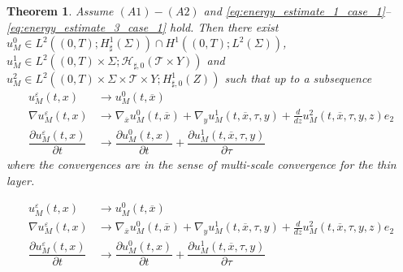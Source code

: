 \documentclass[10pt,a4paper]{amsart}
\newtheorem{theorem}{Theorem}
\def\T{\mathcal{T}}
\def\es{\varepsilon}
\begin{document}
   \begin{theorem}\label{theorem:convergence_in_the_layer}
    Assume $(A1)-(A2)$ and \eqref{eq:energy_estimate_1_case_1}--\eqref{eq:energy_estimate_3_case_1} hold. Then there exist \\ $u_M^0\in L^2((0,T);H^1_{\sharp}(\Sigma))\cap H^1((0,T);L^2(\Sigma))$, $u_M^1\in L^2((0,T)\times \Sigma;\mathcal{H}_{\sharp,0}(\T\times Y))$ and $u_M^2\in L^2((0,T)\times \Sigma \times \T\times Y;H^1_{\sharp,0}(Z) )$ such that up to a subsequence
    \begin{subequations}
    \begin{align}
        u_M^\es(t,x)&\longrightarrow u_M^0(t,\overline{x})\label{eq:multiscale_convergence_for_u}\\
        \nabla u_M^\es(t,x)&\longrightarrow \nabla_{\overline{x}}u_M^0(t,\overline{x})+\nabla_y u_M^1(t,\overline{x},\tau,y)+\frac{d}{dz}u_M^2(t,\overline{x},\tau,y,z)e_2\label{eq:multiscale_convergence_for_gradient_term} \\
        \dfrac{\partial u_M^\es(t,x)}{\partial t}&\longrightarrow  \dfrac{\partial u_M^0(t,x)}{\partial t}+ \dfrac{\partial u_M^1(t,\overline{x},\tau,y)}{\partial \tau}\label{eq:multiscale_convergence_for_time_derivative_term}
    \end{align}
    \end{subequations}
    where the convergences are in the sense of multi-scale convergence for the thin layer.
    \end{theorem}

    \begin{align}
        u_M^\es(t,x)&\longrightarrow u_M^0(t,\overline{x})\\
        \nabla u_M^\es(t,x)&\longrightarrow \nabla_{\overline{x}}u_M^0(t,\overline{x})+\nabla_y u_M^1(t,\overline{x},\tau,y)+\frac{d}{dz}u_M^2(t,\overline{x},\tau,y,z)e_2 \\
        \dfrac{\partial u_M^\es(t,x)}{\partial t}&\longrightarrow  \dfrac{\partial u_M^0(t,x)}{\partial t}+ \dfrac{\partial u_M^1(t,\overline{x},\tau,y)}{\partial \tau}
    \end{align}
\end{document}
